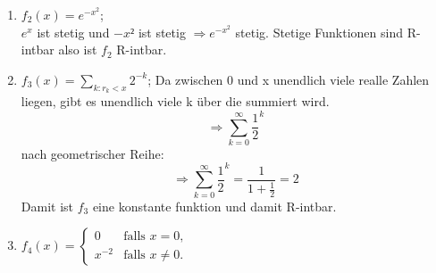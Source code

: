 \documentclass{HM}
\begin{document}
\begin{enumerate}
\begin{enumerate}
			\item $f_2(x)=e^{-x^{2}}$;\\
			$e^x$ ist stetig und $-x²$ ist stetig $\Rightarrow e^{-x^2}$ stetig. Stetige Funktionen sind R-intbar also ist $f_2$ R-intbar. \\

			\item $f_3(x)=\sum\limits_{k:r_k<x}2^{-k}$;
			Da zwischen 0 und x unendlich viele realle Zahlen liegen, gibt es unendlich viele k über die summiert wird. $$\Rightarrow\sum_{k=0}^{\infty}\frac{1}{2}^k$$
			nach geometrischer Reihe:
			$$\Rightarrow\sum_{k=0}^{\infty}\frac{1}{2}^k = \frac{1}{1+\frac{1}{2}}=2$$
			Damit ist $f_3$ eine konstante funktion und damit R-intbar.\\

			\item $f_4(x)=\begin{cases}
				0&\text{falls }x=0,\\
				x^{-2}&\text{falls }x\neq 0.
			\end{cases}$
		\end{enumerate}


\end{enumerate}
\end{document}
